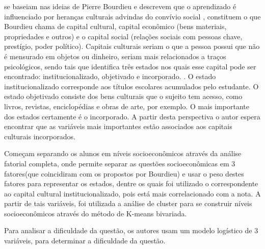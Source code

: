 	 se baseiam nas ideias de Pierre Bourdieu e descrevem que o aprendizado é influenciado por heranças culturais advindas do convívio social , constituem o que Bourdieu chama de capital cultural, capital econômico (bens materiais, propriedades e outros) e o capital social (relações sociais com pessoas chave, prestígio, poder político). Capitais culturais seriam o que a pessoa possui que não é mensurado em objetos ou dinheiro, seriam mais relacionados a traços psicológicos, sendo tais que identifica três estados nos quais esse capital pode ser encontrado: institucionalizado, objetivado e incorporado. . O estado institucionalizado corresponde aos títulos escolares acumulados pelo estudante. O estado objetivado consiste dos bens culturais que o sujeito tem acesso, como livros, revistas, enciclopédias e obras de arte, por exemplo. O mais importante dos estados certamente é o incorporado. A partir desta perspectiva o autor espera encontrar que as variáveis mais importantes estão associados aos capitais culturais incorporados.

	Começam separando os alunos em níveis socioeconômicos através da análise fatorial completa, onde permite separar as questões socioeconômicas em 3 fatores(que coincidiram com os propostos por Bourdieu) e usar o peso destes fatores para representar os estados, dentre os quais foi utilizado o correspondente ao capital cultural institucionalizado, pois está mais correlacionado com a nota. A partir de tais variáveis, foi utilizada a análise de cluster para se construir níveis socioeconômicos através do método de K-means bivariada.

	Para analisar a dificuldade da questão, os autores usam um modelo logístico de 3 variáveis, para determinar a dificuldade da questão.

